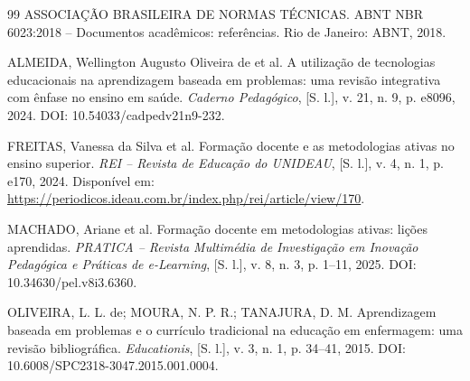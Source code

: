 \begin{thebibliography}{99}
ASSOCIAÇÃO BRASILEIRA DE NORMAS TÉCNICAS. ABNT NBR 6023:2018 -- Documentos acadêmicos: referências. Rio de Janeiro: ABNT, 2018.


ALMEIDA, Wellington Augusto Oliveira de et al. A utilização de tecnologias educacionais na aprendizagem baseada em problemas: uma revisão integrativa com ênfase no ensino em saúde. \textit{Caderno Pedagógico}, [S. l.], v. 21, n. 9, p. e8096, 2024. DOI: 10.54033/cadpedv21n9-232.

FREITAS, Vanessa da Silva et al. Formação docente e as metodologias ativas no ensino superior. \textit{REI -- Revista de Educação do UNIDEAU}, [S. l.], v. 4, n. 1, p. e170, 2024. Disponível em: \url{https://periodicos.ideau.com.br/index.php/rei/article/view/170}.

MACHADO, Ariane et al. Formação docente em metodologias ativas: lições aprendidas. \textit{PRATICA -- Revista Multimédia de Investigação em Inovação Pedagógica e Práticas de e-Learning}, [S. l.], v. 8, n. 3, p. 1--11, 2025. DOI: 10.34630/pel.v8i3.6360.

OLIVEIRA, L. L. de; MOURA, N. P. R.; TANAJURA, D. M. Aprendizagem baseada em problemas e o currículo tradicional na educação em enfermagem: uma revisão bibliográfica. \textit{Educationis}, [S. l.], v. 3, n. 1, p. 34--41, 2015. DOI: 10.6008/SPC2318-3047.2015.001.0004.


\end{thebibliography}
